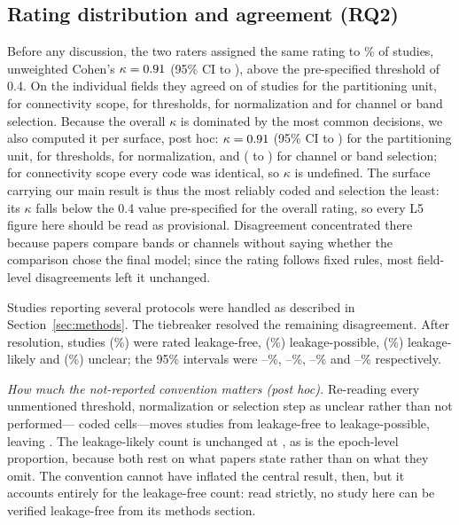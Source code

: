 \subsection{Rating distribution and agreement (RQ2)}
Before any discussion, the two raters assigned the same rating to \PctAgree\% of studies, unweighted Cohen's $\kappa = 0.91$ (95\% CI \KappaLo{} to \KappaHi), above the pre-specified threshold of 0.4. On the individual fields they agreed on \AgreeSplit{} of \Nstudies{} studies for the partitioning unit, \AgreeScope{} for connectivity scope, \AgreeThresh{} for thresholds, \AgreeNorm{} for normalization and \AgreeSelect{} for channel or band selection.
Because the overall $\kappa$ is dominated by the most common decisions, we also computed it per surface, post hoc: $\kappa = 0.91$ (95\% CI \KapLoneLo{} to \KapLoneHi) for the partitioning unit, \KapLthree{} for thresholds, \KapLfour{} for normalization, and \KapLfive{} (\KapLfiveLo{} to \KapLfiveHi) for channel or band selection; for connectivity scope every code was identical, so $\kappa$ is undefined. The surface carrying our main result is thus the most reliably coded and selection the least: its $\kappa$ falls below the 0.4 value pre-specified for the overall rating, so every L5 figure here should be read as provisional. Disagreement concentrated there because papers compare bands or channels without saying whether the comparison chose the final model; since the rating follows fixed rules, most field-level disagreements left it unchanged.

Studies reporting several protocols were handled as described in Section~\ref{sec:methods}. The tiebreaker resolved the remaining disagreement. After resolution, \NFree{} studies (\PctFree\%) were rated leakage-free, \NPossible{} (\PctPossible\%) leakage-possible, \NLikely{} (\PctLikely\%) leakage-likely and \NUnclear{} (\PctUnclear\%) unclear; the 95\% intervals were \PctFreeLo--\PctFreeHi\%, \PctPossibleLo--\PctPossibleHi\%, \PctLikelyLo--\PctLikelyHi\% and \PctUnclearLo--\PctUnclearHi\% respectively.

\emph{How much the not-reported convention matters (post hoc).} Re-reading every unmentioned threshold, normalization or selection step as unclear rather than not performed---\StrictNcells{} coded cells---moves \StrictNchanged{} studies from leakage-free to leakage-possible, leaving \StrictNfree. The leakage-likely count is unchanged at \StrictNlikely, as is the epoch-level proportion, because both rest on what papers state rather than on what they omit. The convention cannot have inflated the central result, then, but it accounts entirely for the leakage-free count: read strictly, no study here can be verified leakage-free from its methods section.


